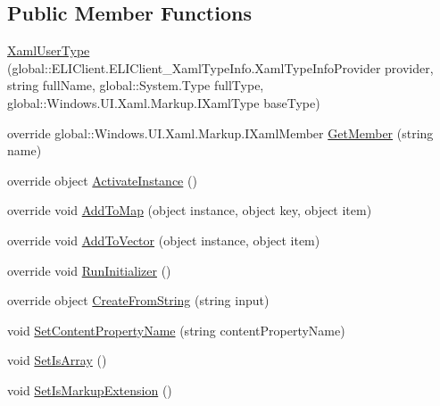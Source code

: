 \subsection*{Public Member Functions}
\begin{DoxyCompactItemize}
\item 
\hyperlink{class_e_l_i_client_1_1_e_l_i_client___xaml_type_info_1_1_xaml_user_type_a909746a87650e014303a361f94cf2fa9}{Xaml\+User\+Type} (global\+::\+E\+L\+I\+Client.\+E\+L\+I\+Client\+\_\+\+Xaml\+Type\+Info.\+Xaml\+Type\+Info\+Provider provider, string full\+Name, global\+::\+System.\+Type full\+Type, global\+::\+Windows.\+U\+I.\+Xaml.\+Markup.\+I\+Xaml\+Type base\+Type)
\item 
override global\+::\+Windows.\+U\+I.\+Xaml.\+Markup.\+I\+Xaml\+Member \hyperlink{class_e_l_i_client_1_1_e_l_i_client___xaml_type_info_1_1_xaml_user_type_ae0b59b2b8f38cd92bb7b5104832683cd}{Get\+Member} (string name)
\item 
override object \hyperlink{class_e_l_i_client_1_1_e_l_i_client___xaml_type_info_1_1_xaml_user_type_ab0cbcd619f25fa68eee6c3472c28d8f8}{Activate\+Instance} ()
\item 
override void \hyperlink{class_e_l_i_client_1_1_e_l_i_client___xaml_type_info_1_1_xaml_user_type_aaae5b06ef5d7b0332b2517490a148da3}{Add\+To\+Map} (object instance, object key, object item)
\item 
override void \hyperlink{class_e_l_i_client_1_1_e_l_i_client___xaml_type_info_1_1_xaml_user_type_a212eb4d186b8a5798d6666f8fbd21921}{Add\+To\+Vector} (object instance, object item)
\item 
override void \hyperlink{class_e_l_i_client_1_1_e_l_i_client___xaml_type_info_1_1_xaml_user_type_a78347a092b725bf90a0ad3a23fc09304}{Run\+Initializer} ()
\item 
override object \hyperlink{class_e_l_i_client_1_1_e_l_i_client___xaml_type_info_1_1_xaml_user_type_a848d739150fec23c2400d5718049ea30}{Create\+From\+String} (string input)
\item 
void \hyperlink{class_e_l_i_client_1_1_e_l_i_client___xaml_type_info_1_1_xaml_user_type_a50b781dfa7e66028905f1c87d6225aa0}{Set\+Content\+Property\+Name} (string content\+Property\+Name)
\item 
void \hyperlink{class_e_l_i_client_1_1_e_l_i_client___xaml_type_info_1_1_xaml_user_type_a0080f0e1e012ffece2004457228b709e}{Set\+Is\+Array} ()
\item 
void \hyperlink{class_e_l_i_client_1_1_e_l_i_client___xaml_type_info_1_1_xaml_user_type_a2c6f690fd071acce19668edc1dfd1f93}{Set\+Is\+Markup\+Extension} ()

\end{DoxyCompactItemize}
